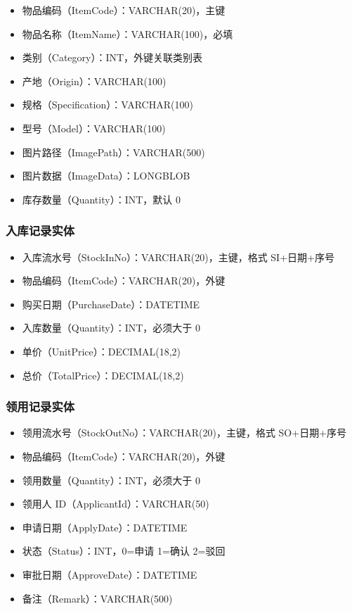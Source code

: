 \documentclass[12pt,a4paper]{ctexart}
\begin{document}
\begin{itemize}
    \item 物品编码（ItemCode）：VARCHAR(20)，主键
    \item 物品名称（ItemName）：VARCHAR(100)，必填
    \item 类别（Category）：INT，外键关联类别表
    \item 产地（Origin）：VARCHAR(100)
    \item 规格（Specification）：VARCHAR(100)
    \item 型号（Model）：VARCHAR(100)
    \item 图片路径（ImagePath）：VARCHAR(500)
    \item 图片数据（ImageData）：LONGBLOB
    \item 库存数量（Quantity）：INT，默认 0
\end{itemize}

\subsubsection{入库记录实体}

\begin{itemize}
    \item 入库流水号（StockInNo）：VARCHAR(20)，主键，格式 SI+日期+序号
    \item 物品编码（ItemCode）：VARCHAR(20)，外键
    \item 购买日期（PurchaseDate）：DATETIME
    \item 入库数量（Quantity）：INT，必须大于 0
    \item 单价（UnitPrice）：DECIMAL(18,2)
    \item 总价（TotalPrice）：DECIMAL(18,2)
\end{itemize}

\subsubsection{领用记录实体}

\begin{itemize}
    \item 领用流水号（StockOutNo）：VARCHAR(20)，主键，格式 SO+日期+序号
    \item 物品编码（ItemCode）：VARCHAR(20)，外键
    \item 领用数量（Quantity）：INT，必须大于 0
    \item 领用人 ID（ApplicantId）：VARCHAR(50)
    \item 申请日期（ApplyDate）：DATETIME
    \item 状态（Status）：INT，0=申请 1=确认 2=驳回
    \item 审批日期（ApproveDate）：DATETIME
    \item 备注（Remark）：VARCHAR(500)
\end{itemize}
\end{document}
